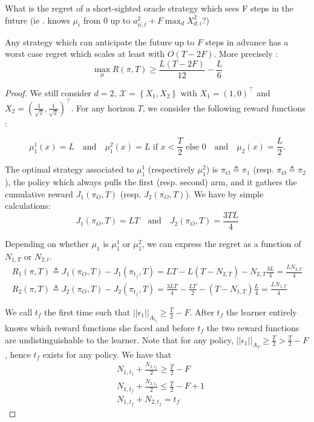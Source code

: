 What is the regret of a short-sighted oracle strategy which sees F steps in the future (ie . knows $\mu_i$ from $0$ up to $a_{ii,t}^2 + F \max_d X_{d,i}^2$?)
\begin{theorem}
Any strategy which can anticipate the future up to $F$ steps in advance has a worst case regret which scales at least with $O(T-2F)$. More precisely : 
\[
\max_\mu R(\pi, T) \geq  \frac{L(T-2F)}{12} - \frac{L}{6}
\]
\end{theorem}
\begin{proof}
We still consider $d = 2$, $\mathcal{X} = \left\{ X_1, X_2 \right\}$ with $X_1 = (1,0)^\intercal$ and $X_2 = (\frac{1}{\sqrt{2}},\frac{1}{\sqrt{2}})^\intercal$. For any horizon $T$, we consider the following reward functions :

\[\mu_1^1(x) = L \quad \text{and} \quad\mu_1^2(x) = L \text{ if } x < \frac{T}{2} \text{ else } 0 \quad \text{and} \quad  \mu_2(x) = \frac{L}{2}.
\]

The optimal strategy associated to $\mu_1^1$ (respectively $\mu_1^2$) is $\pi_O \triangleq \pi_1$  (resp. $\pi_O \triangleq\pi_2$), the policy which always pulls the first (resp. second) arm, and it gathers the cumulative reward $J_1(\pi_O, T)$ (resp. $J_2(\pi_O, T)$). We have by simple calculations:
\[
J_1(\pi_O, T) = LT \quad \text{and} \quad J_2(\pi_O, T) = \frac{3TL}{4} 
\]

Depending on whether $\mu_1$ is $\mu_1^1$ or $\mu_1^2$, we can express the regret as a function of $N_{1,T}$ or $N_{2,t}$.
\begin{align}
R_1(\pi, T) \triangleq J_1(\pi_O, T) - J_1(\pi_{t_f},T) = LT -  L (T- N_{2,T}) -  N_{2,T} \frac{3L}{4}  = \frac{LN_{2,T}}{4}\\
R_2(\pi, T) \triangleq J_2(\pi_O, T) - J_2(\pi_{t_f},T) = \frac{3LT}{4} -  \frac{LT}{2}  -  (T- N_{1,T}) \frac{L}{4}  = \frac{LN_{1,T}}{4}
\end{align}


 
We call $t_f$ the first time such that $||\epsilon_1 ||_{A_{t_f}} \geq \frac{T}{2} - F$. After $t_f$ the learner entirely knows which reward functions she faced and before $t_f$ the two reward functions are undistinguishable to the learner.  Note that for any policy, $||\epsilon_1 ||_{A_{T}} \geq \frac{T}{2}  > \frac{T}{2} - F$, hence $t_f$ exists for any policy.  We have that
\begin{align}
& N_{1, t_f} + \frac{N_{2, t_f}}{2} \geq \frac{T}{2} - F  \\
& N_{1, t_f} + \frac{N_{2, t_f}}{2} \leq \frac{T}{2} - F + 1 \\
& N_{1, t_f} + N_{2, t_f} = t_f
\end{align}


\end{proof}
